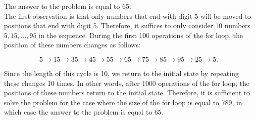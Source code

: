 \begin{solution}
The answer to the problem is equal to 65.\\[0.2cm]

The first observation is that only numbers that end with digit 5 will be moved to positions that end with digit 5. Therefore, it suffices to only consider 10 numbers $5, 15, \ldots, 95$ in the sequence.
During the first 100 operations of the for loop, the position of these numbers changes as follows:

$$5 \rightarrow 15 \rightarrow 35 \rightarrow 45 \rightarrow 55 \rightarrow 65 \rightarrow 75 \rightarrow 85 \rightarrow 95 \rightarrow 25 \rightarrow 5.$$

Since the length of this cycle is 10, we return to the initial state by repeating these changes 10 times. In other words, after 1000 operations of the for loop, the positions of these numbers return to the initial state. Therefore, it is sufficient to solve the problem for the case where the size of the for loop is equal to 789, in which case the answer to the problem is equal to 65.



\end{solution}